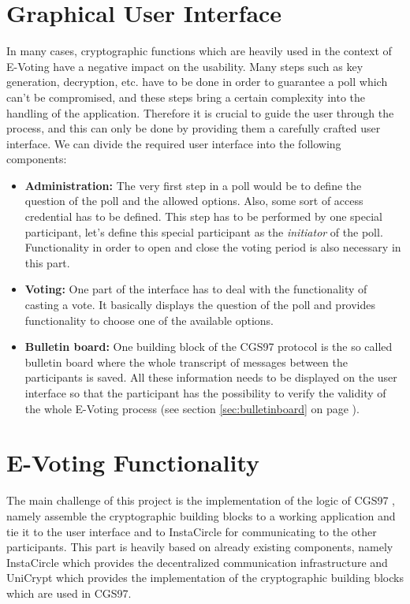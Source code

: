 \documentclass[numbers=noenddot, abstract=on]{scrreprt}
\newcommand{\myref}[1]{(see section \ref{#1} on page \pageref{#1})}
\begin{document}
\section{Graphical User Interface}
\label{sec:gui}
In many cases, cryptographic functions which are heavily used in the context of
E-Voting have a negative impact on the usability. Many steps such as key
generation, decryption, etc. have to be done in order to guarantee a poll which
can't be compromised, and these steps bring a certain complexity into the
handling of the application. Therefore it is crucial to guide the user
through the process, and this can only be done by providing them a carefully
crafted user interface. We can divide the required user interface into the
following components:
\begin{itemize}
  \item \textbf{Administration:} The very first step in a poll would be to
  define the question of the poll and the allowed options. Also, some sort of
  access credential has to be defined. This step has to be performed by one
  special participant, let's define this special participant as the
  \textit{initiator} of the poll. Functionality in order to open and close the
  voting period is also necessary in this part.
  \item \textbf{Voting:} One part of the interface has to deal with the
  functionality of casting a vote. It basically displays the question of the
  poll and provides functionality to choose one of the available options.
  \item \textbf{Bulletin board:} One building block of the CGS97 protocol
  \cite{CGS97} is the so called bulletin board where the whole transcript of
  messages between the participants is saved. All these information needs to be displayed on the
  user interface so that the participant has the possibility to verify the
  validity of the whole E-Voting process \myref{sec:bulletinboard}.
\end{itemize}

\section{E-Voting Functionality}
\label{sec:evotingfunctionality}
The main challenge of this project is the implementation of the logic of CGS97 
\cite{CGS97}, namely assemble the cryptographic building blocks to a working
application and tie it to the user interface and to InstaCircle for communicating to the other
participants. This part is heavily based on already existing components, namely
InstaCircle which provides the decentralized communication infrastructure and
UniCrypt which provides the implementation of the cryptographic building blocks
which are used in CGS97.
\end{document}
